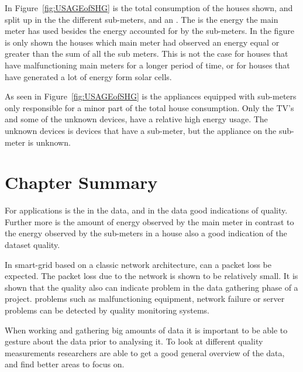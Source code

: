 In Figure~\ref{fig:USAGEofSHG} is the total consumption of the houses shown, and split up in the the different sub-meters, and an . The  is the energy the main meter has used besides the energy accounted for by the sub-meters. In the figure is only shown the houses which main meter had observed an energy equal or greater than the sum of all the sub meters. This is not the case for houses that have malfunctioning main meters for a longer period of time, or for houses that have generated a lot of energy form solar cells. 

As seen in Figure~\ref{fig:USAGEofSHG} is the appliances equipped with sub-meters only responsible for a minor part of the total house consumption. Only the TV's and some of the unknown devices, have a relative high energy usage. The unknown devices is devices that have a sub-meter, but the appliance on the sub-meter is unknown.  

\newpage

\section{Chapter Summary}
For  applications is the  in the data, and  in the data good indications of quality. Further more is the amount of energy observed by the main meter in contrast to the energy observed by the sub-meters in a house also a good indication of the dataset quality. 

In smart-grid based on a classic  network architecture, can a packet loss be expected. The packet loss due to the network is shown to be relatively small. It is shown that the quality also can indicate problem in the data gathering phase of a project. problems such as malfunctioning equipment, network failure or server problems can be detected by quality monitoring systems.  

When working and gathering big amounts of data it is important to be able to gesture about the data prior to analysing it. To look at different quality measurements researchers are able to get a good general overview of the data, and find better areas to focus on. 

